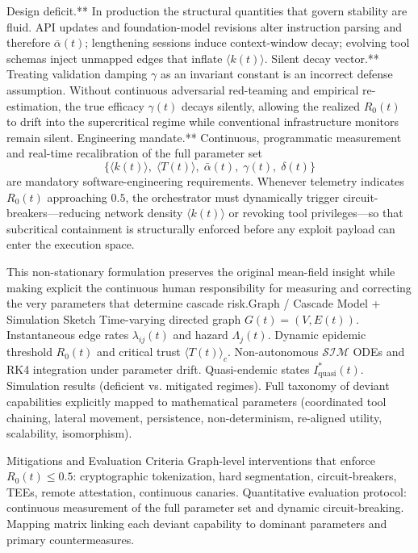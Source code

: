 Design deficit.** In production the structural quantities that govern stability are fluid. API updates and foundation-model revisions alter instruction parsing and therefore \(\bar{\alpha}(t)\); lengthening sessions induce context-window decay; evolving tool schemas inject unmapped edges that inflate \(\langle k(t) \rangle\).
Silent decay vector.** Treating validation damping \(\gamma\) as an invariant constant is an incorrect defense assumption. Without continuous adversarial red-teaming and empirical re-estimation, the true efficacy \(\gamma(t)\) decays silently, allowing the realized \(R_0(t)\) to drift into the supercritical regime while conventional infrastructure monitors remain silent.
Engineering mandate.** Continuous, programmatic measurement and real-time recalibration of the full parameter set
  \[
  \bigl\{\langle k(t)\rangle,\;\langle T(t)\rangle,\;\bar{\alpha}(t),\;\gamma(t),\;\delta(t)\bigr\}
  \]
  are mandatory software-engineering requirements. Whenever telemetry indicates \(R_0(t)\) approaching \(0.5\), the orchestrator must dynamically trigger circuit-breakers—reducing network density \(\langle k(t)\rangle\) or revoking tool privileges—so that subcritical containment is structurally enforced before any exploit payload can enter the execution space.

This non-stationary formulation preserves the original mean-field insight while making explicit the continuous human responsibility for measuring and correcting the very parameters that determine cascade risk.Graph / Cascade Model + Simulation Sketch
Time-varying directed graph \(G(t)=(V,E(t))\).
Instantaneous edge rates \(\lambda_{ij}(t)\) and hazard \(\Lambda_j(t)\).
Dynamic epidemic threshold \(R_0(t)\) and critical trust \(\langle T(t)\rangle_c\).
Non-autonomous \(\mathcal{S}\mathcal{I}\mathcal{M}\) ODEs and RK4 integration under parameter drift.
Quasi-endemic states \(I_{\mathrm{quasi}}^*(t)\).
Simulation results (deficient vs. mitigated regimes).
Full taxonomy of deviant capabilities explicitly mapped to mathematical parameters (coordinated tool chaining, lateral movement, persistence, non-determinism, re-aligned utility, scalability, isomorphism).

Mitigations and Evaluation Criteria
Graph-level interventions that enforce \(R_0(t)\le0.5\): cryptographic tokenization, hard segmentation, circuit-breakers, TEEs, remote attestation, continuous canaries.
Quantitative evaluation protocol: continuous measurement of the full parameter set and dynamic circuit-breaking.
Mapping matrix linking each deviant capability to dominant parameters and primary countermeasures.

